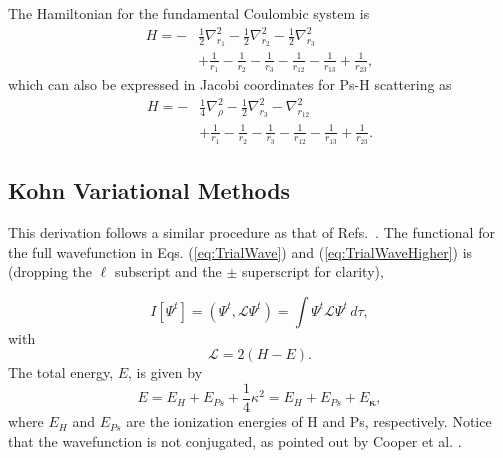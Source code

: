 \documentclass[preprint,showpacs,showkeys,preprintnumbers,amsmath,amssymb,longbibliography,pra,aps]{revtex4-1}
\begin{document}
The Hamiltonian for the fundamental Coulombic system is
\begin{align}
H = -&\frac{1}{2} \nabla_{r_1}^2 - \frac{1}{2} \nabla_{r_2}^2 - \frac{1}{2}
  \nabla_{r_3}^2  \nonumber \\
&+ \frac{1}{r_1} - \frac{1}{r_2} - \frac{1}{r_3} - \frac{1}{r_{12}} -
  \frac{1}{r_{13}}+\frac {1}{r_{23}},
\label{eq:Hamiltonian1}
\end{align}
which can also be expressed in Jacobi coordinates for Ps-H scattering as
\begin{align}
H = -&\frac{1}{4} \nabla_{\rho}^2 - \frac{1}{2} \nabla_{r_3}^2 -
  \nabla_{r_{12}}^2  \nonumber \\
&+ \frac{1}{r_1} - \frac{1}{r_2} - \frac{1}{r_3} - \frac{1}{r_{12}} -
  \frac{1}{r_{13}}+\frac{1}{r_{23}}.
\label{eq:Hamiltonian2}
\end{align}


\subsection{Kohn Variational Methods}
\label{sec:Kohn}
This derivation follows a similar procedure as that of
Refs.~\cite{Lucchese1989,Cooper2010,Armour1991,VanReethThesis}.
The functional for the full wavefunction in Eqs. (\ref{eq:TrialWave}) and
(\ref{eq:TrialWaveHigher}) is (dropping the $\ell$ subscript and the $\pm$ 
superscript for clarity),

\begin{equation}
I[\Psi^t] = \left(\Psi^t, \mathcal{L} \Psi^t \right) = \int \Psi^t \mathcal{L}
  \Psi^t \,d\tau,
\label{eq:IlDefPsi}
\end{equation}
with
\begin{equation}
\mathcal{L} = 2(H - E).
\label{eq:LDef}
\end{equation}
The total energy, $E$, is given by
\begin{equation}
\label{eq:TotalEnergy}
E = E_H + E_{Ps} + \frac{1}{4}\kappa^2 = E_H + E_{Ps} + E_{\bm \kappa},
\end{equation}
where $E_H$ and $E_{Ps}$ are the ionization energies of H and Ps, respectively.
Notice that the wavefunction is not conjugated, as pointed out by Cooper et al.
\cite{Cooper2010}.
\end{document}
